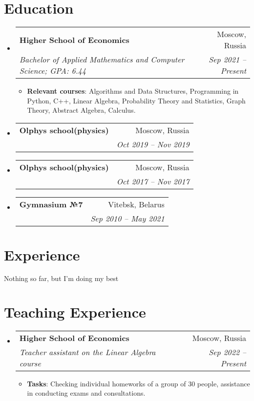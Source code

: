 \documentclass{resume}
\makeatletter
\newcommand{\resumeItem}[2]{
  \item\small{
    \textbf{#1}{: #2 \vspace{-2pt}}
  }
}
\newcommand{\resumeSubheading}[4]{
  \vspace{-1pt}\item
    \begin{tabular*}{0.97\textwidth}[t]{l@{\extracolsep{\fill}}r}
      \textbf{#1} & #2 \\
      \textit{\small#3} & \textit{\small #4} \\
    \end{tabular*}\vspace{-5pt}
}
\newcommand{\resumeSubHeadingListStart}{\begin{itemize}[leftmargin=*]}
\newcommand{\resumeSubHeadingListEnd}{\end{itemize}}
\newcommand{\resumeItemListStart}{\begin{itemize}}
\newcommand{\resumeItemListEnd}{\end{itemize}\vspace{-5pt}}
\makeatother
\begin{document}
\section{Education}
  \resumeSubHeadingListStart
    \resumeSubheading
      {Higher School of Economics}{Moscow, Russia}
      {Bachelor of Applied Mathematics and Computer Science;  GPA: 6.44}{Sep 2021 -- Present}
      \resumeItemListStart
      \medskip
      \resumeItem{Relevant courses} {Algorithms and Data Structures, Programming in Python, C++, Linear Algebra, Probability Theory and Statistics, Graph Theory, Abstract Algebra, Calculus.}
      \resumeItemListEnd
      \bigskip
      \resumeSubheading
        {Olphys school(physics)}{Moscow, Russia}{}{Oct 2019 -- Nov 2019}
        \bigskip
      \resumeSubheading
        {Olphys school(physics)}{Moscow, Russia}{}{Oct 2017 -- Nov 2017}
        \bigskip
      \resumeSubheading
        {Gymnasium №7}{Vitebsk, Belarus}{}{Sep 2010 -- May 2021}
  \resumeSubHeadingListEnd


\section{Experience}
Nothing so far, but I'm doing my best


\section{Teaching Experience}
\resumeSubHeadingListStart
    \resumeSubheading
      {Higher School of Economics}{Moscow, Russia}
      {Teacher assistant on the Linear Algebra course}{Sep 2022 -- Present}
      \resumeItemListStart
      \medskip
      \resumeItem{Tasks} {Checking individual homeworks of a group of 30 people, assistance in conducting exams and consultations.}
      \resumeItemListEnd
  \resumeSubHeadingListEnd
\end{document}
